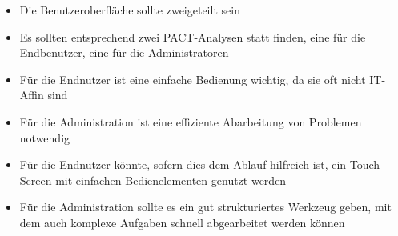 \documentclass[a4paper,10pt]{article}
\begin{document}
\kopf
\renewcommand{\figurename}{Figure}


\begin{itemize}
\item Die Benutzeroberfläche sollte zweigeteilt sein
\item Es sollten entsprechend zwei PACT-Analysen statt finden, eine für die Endbenutzer, eine für die Administratoren
\item Für die Endnutzer ist eine einfache Bedienung wichtig, da sie oft nicht IT-Affin sind
\item Für die Administration ist eine effiziente Abarbeitung von Problemen notwendig
\item Für die Endnutzer könnte, sofern dies dem Ablauf hilfreich ist, ein Touch-Screen mit einfachen Bedienelementen genutzt werden
\item Für die Administration sollte es ein gut strukturiertes Werkzeug geben, mit dem auch komplexe Aufgaben schnell abgearbeitet werden können
\end{itemize}
\end{document}
